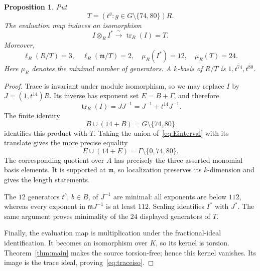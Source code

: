 \documentclass[11pt,letterpaper]{article}
\newtheorem{proposition}[theorem]{Proposition}
\theoremstyle{remark}
\newcommand{\m}{\mathfrak m}
\newcommand{\tr}{\operatorname{tr}}
\newcommand{\length}{\ell}
\numberwithin{equation}{section}
\begin{document}
\begin{proposition}\label{prop:trace}
Put
\[
 T=(t^g:g\in G\setminus\{74,80\})R.
\]
The evaluation map induces an isomorphism
\begin{equation}\label{eq:traceiso}
 I\otimes_R I^*\xrightarrow{\ \sim\ }\tr_R(I)=T.
\end{equation}
Moreover,
\[
 \length_R(R/T)=3,\quad \length_R(\m/T)=2,\quad
 \mu_R(I^*)=12,\quad\mu_R(T)=24.
\]
Here $\mu_R$ denotes the minimal number of generators. A $k$-basis of $R/T$ is $1,\overline{t^{74}},\overline{t^{80}}$.
\end{proposition}
\begin{proof}
Trace is invariant under module isomorphism, so we may replace $I$ by $J=(1,t^{14})R$. Its inverse has exponent set $E=B+\Gamma$, and therefore
\[
 \tr_R(I)=JJ^{-1}=J^{-1}+t^{14}J^{-1}.
\]
The finite identity
\[
 B\cup(14+B)=G\setminus\{74,80\}
\]
identifies this product with $T$. Taking the union of~\eqref{eq:Einterval} with its translate gives the more precise equality
\begin{equation}\label{eq:tracevalues}
 E\cup(14+E)=\Gamma\setminus\{0,74,80\}.
\end{equation}
The corresponding quotient over $A$ has precisely the three asserted monomial basis elements. It is supported at $\m$, so localization preserves its $k$-dimension and gives the length statements.

The $12$ generators $t^b$, $b\in B$, of $J^{-1}$ are minimal: all exponents are below $112$, whereas every exponent in $\m J^{-1}$ is at least $112$. Scaling identifies $I^*$ with $J^*$. The same argument proves minimality of the $24$ displayed generators of $T$.

Finally, the evaluation map is multiplication under the fractional-ideal identification. It becomes an isomorphism over $K$, so its kernel is torsion. Theorem~\ref{thm:main} makes the source torsion-free; hence this kernel vanishes. Its image is the trace ideal, proving~\eqref{eq:traceiso}.
\end{proof}
\end{document}
